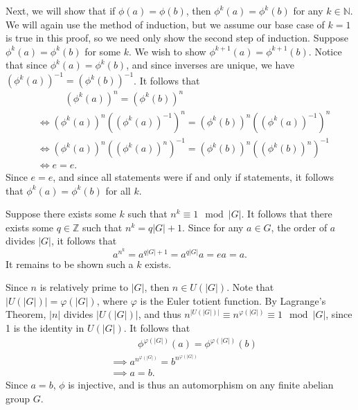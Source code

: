 \documentclass[11pt, letterpaper]{article}
\begin{document}
\begin{solution}
Next, we will show that if $\phi (a)=\phi (b)$, then $\phi^k\left(a \right) =\phi^k(b)$ for any $k\in\mathbb{N}$. We will again use the method of induction, but we assume our base case of $k=1$ is true in this proof, so we need only show the second step of induction. Suppose $\phi ^k(a)=\phi ^k(b)$ for some $k$. We wish to show $\phi ^{k+1}(a)=\phi ^{k+1}(b)$. Notice that since $\phi ^k(a)=\phi ^k\left(b \right) $, and since inverses are unique, we have $\left( \phi ^k(a) \right) ^{-1}=\left( \phi ^k(b) \right) ^{-1}$. It follows that
\begin{align*}
	&\qquad\;\;\; \left( \phi ^k(a) \right) ^n=\left( \phi ^k(b) \right) ^n\\
	&\iff \left( \phi ^k(a) \right) ^n \left( \left( \phi ^k(a) \right) ^{-1} \right) ^{n}=\left( \phi ^k(b) \right) ^n \left( \left( \phi ^k(a) \right) ^{-1} \right) ^{n}\\
	&\iff\left( \phi ^k(a) \right) ^n \left( \left( \phi ^k(a) \right) ^n \right) ^{-1}=\left( \phi ^k(b) \right) ^n \left( \left( \phi ^k(b) \right) ^n \right) ^{-1}\\
	&\iff e=e
.\end{align*}
Since $e=e$, and since all statements were if and only if statements, it follows that $\phi ^{k}(a)=\phi ^k(b)$ for all $k$.

Suppose there exists some $k$ such that $n^k\equiv 1\mod{\left| G \right| }$. It follows that there exists some $q\in\mathbb{Z}$ such that $n^k = q\left| G \right|+1 $. Since for any $a\in G$, the order of $a$ divides $\left| G \right| $, it follows that
\[
	a^{n^k}=a^{q\left| G \right| +1}=a^{q\left| G \right| }a=ea=a
.\]
It remains to be shown such a $k$ exists.

Since $n$ is relatively prime to $\left| G \right| $, then $n\in U(\left| G \right| )$. Note that $\left| U(\left| G \right| ) \right| =\varphi (\left| G \right| )$, where $\varphi $ is the Euler totient function. By Lagrange's Theorem, $\left| n \right| $ divides $\left| U(\left| G \right| ) \right| $, and thus $n^{\left| U(\left| G \right| ) \right| }\equiv n^{\varphi (\left| G \right| )}\equiv 1\mod{\left| G \right| }$, since 1 is the identity in $U(\left| G \right| )$. It follows that
\begin{align*}
	&\qquad\;\;\; \phi^{\varphi (\left| G \right| )}(a)=\phi ^{\varphi (\left| G \right| )}(b)\\
	&\implies a^{n^{\varphi (\left| G \right| )}}=b^{n^{\varphi (\left| G \right| )}}\\
	&\implies a=b
.\end{align*}
Since $a=b$, $\phi $ is injective, and is thus an automorphism on any finite abelian group $G$.
\end{solution}
\end{document}

